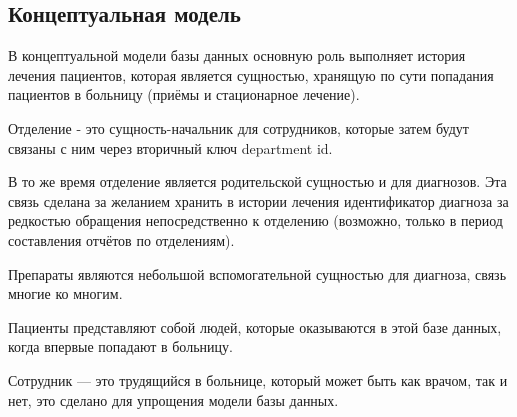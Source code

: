\documentclass[12pt]{article}
\begin{document}
	\subsection{Концептуальная модель}
	\begin{center}
	\end{center}
	В концептуальной модели базы данных основную роль выполняет история лечения пациентов, которая является сущностью, хранящую по сути попадания пациентов в больницу (приёмы и стационарное лечение).
	
	Отделение - это сущность-начальник для сотрудников, которые затем будут связаны с ним через вторичный ключ department id.
	
	В то же время отделение является родительской сущностью и для диагнозов. Эта связь сделана за желанием хранить в истории лечения идентификатор диагноза за редкостью обращения непосредственно к отделению (возможно, только в период составления отчётов по отделениям).
	
	Препараты являются небольшой вспомогательной сущностью для диагноза, связь многие ко многим. 
	
	Пациенты представляют собой людей, которые оказываются в этой базе данных, когда впервые попадают в больницу.
	
	Сотрудник --- это трудящийся в больнице, который может быть как врачом, так и нет, это сделано для упрощения модели базы данных.
\end{document}
